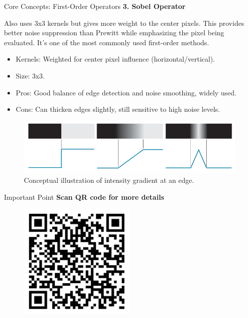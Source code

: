 \documentclass[final]{beamer}
\newlength{\colwidth}
\begin{document}
\begin{frame}[t]
\begin{columns}[t]
\begin{column}{\colwidth}
\begin{block}{Core Concepts: First-Order Operators}
    \textbf{3. Sobel Operator} \par
    Also uses 3x3 kernels but gives more weight to the center pixels. This provides better noise suppression than Prewitt while emphasizing the pixel being evaluated. It's one of the most commonly used first-order methods.
     \begin{itemize}
        \item Kernels: Weighted for center pixel influence (horizontal/vertical).
        \item Size: 3x3.
        \item Pros: Good balance of edge detection and noise smoothing, widely used.
        \item Cons: Can thicken edges slightly, still sensitive to high noise levels.
    \end{itemize}
     \begin{figure}
       \centering
       \includegraphics[width=0.9\linewidth]{logoss/intensity.png} %
       \caption{Conceptual illustration of intensity gradient at an edge.}
       \label{fig:edge_concept}
     \end{figure}
  \end{block}

   \begin{alertblock}{Important Point}
    \centering
    \textbf{Scan QR code for more details}
    \begin{figure}[h]
        \centering
        \includegraphics[width = 0.5\textwidth]{logoss/qr.png}
        \label{fig:my_zero}
    \end{figure}
  \end{alertblock}


\end{column}
\end{columns}
\end{frame}
\end{document}
